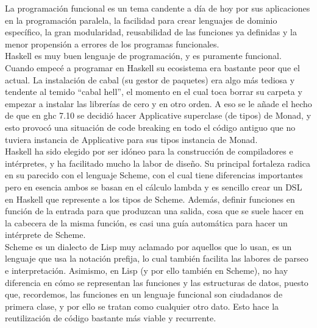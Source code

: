 

La programaci\'on funcional es un tema candente a d\'ia de hoy por sus aplicaciones en la programaci\'on paralela, la facilidad para crear lenguajes de dominio espec\'ifico, la gran modularidad, reusabilidad de las funciones ya definidas y la menor propensi\'on a errores de los programas funcionales.\\

Haskell es muy buen lenguaje de programaci\'on, y es puramente funcional. Cuando empec\'e a programar en Haskell su ecosistema era bastante peor que el actual. La instalaci\'on de cabal (su gestor de paquetes) era algo m\'as tediosa y tendente al temido ``cabal hell'', el momento en el cual toca borrar su carpeta y empezar a instalar las librer\'ias de cero y en otro orden. A eso se le a\~{n}ade el hecho de que en ghc 7.10 se decidi\'o hacer Applicative superclase (de tipos) de Monad, y esto provoc\'o una situaci\'on de code breaking en todo el c\'odigo antiguo que no tuviera instancia de Applicative para sus tipos instancia de Monad.\\

Haskell ha sido elegido por ser id\'oneo para la construcci\'on de compiladores e int\'erpretes, y ha facilitado mucho la labor de dise\~{n}o. Su principal fortaleza radica en su parecido con el lenguaje Scheme, con el cual tiene diferencias importantes pero en esencia ambos se basan en el c\'alculo lambda y es sencillo crear un DSL en Haskell que represente a los tipos de Scheme. Adem\'as, definir funciones en funci\'on de la entrada para que produzcan una salida, cosa que se suele hacer en la cabecera de la misma funci\'on, es casi una gu\'ia autom\'atica para hacer un int\'erprete de Scheme.\\

Scheme es un dialecto de Lisp muy aclamado por aquellos que lo usan, es un lenguaje que usa la notaci\'on prefija, lo cual tambi\'en facilita las labores de parseo e interpretaci\'on. Asimismo, en Lisp (y por ello tambi\'en en Scheme), no hay diferencia en c\'omo se representan las funciones y las estructuras de datos, puesto que, recordemos, las funciones en un lenguaje funcional son ciudadanos de primera clase, y por ello se tratan como cualquier otro dato. Esto hace la reutilizaci\'on de c\'odigo bastante m\'as viable y recurrente.\\

